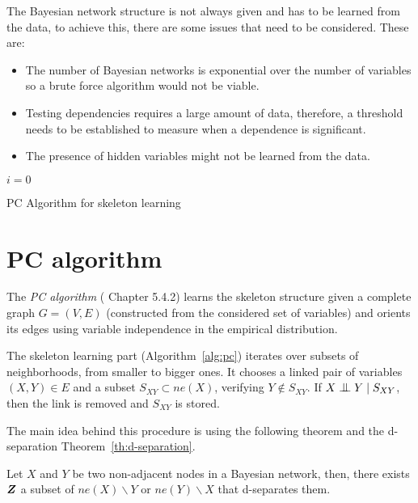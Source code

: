 
The Bayesian network structure is not always given and has to be learned from the data, to achieve this, there are some issues that need to be considered. These are:
\begin{itemize}\setlength{\itemsep}{0.15cm}
  \item The number of Bayesian networks is exponential over the number of variables so a brute force algorithm would not be viable.
  \item Testing dependencies requires a large amount of data, therefore, a threshold needs to be established to measure when a dependence is significant.
  \item The presence of hidden variables might not be learned from the data.
\end{itemize}


\begin{algorithm}[t]
  \SetAlgoLined{}
  \(i = 0\)\;
  \caption{PC Algorithm for skeleton learning}\label{alg:pc}
\end{algorithm}

\section{PC algorithm}

The \emph{PC algorithm} (\cite{spirtes2000causation} Chapter 5.4.2) learns the skeleton structure given a complete graph \(G=(V,E)\) (constructed from the considered set of variables) and orients its edges using variable independence in the empirical distribution.

The skeleton learning part (Algorithm~\ref{alg:pc}) iterates over subsets of neighborhoods, from smaller to bigger ones. It chooses a linked pair of variables \((X,Y) \in E\) and
a subset \(S_{XY} \subset ne(X)\), verifying \(Y \notin S_{XY}\). If \(X \bigCI Y \mid S_{XY}\), then the link is removed and \(S_{XY}\) is stored.

The main idea behind this procedure is using the following theorem and the d-separation Theorem~\ref{th:d-separation}.
\begin{theorem}
  Let \(X\) and \(Y\) be two non-adjacent nodes in a Bayesian network, then, there exists \(\bm{Z}\) a subset of \(ne(X)\backslash Y\) or \(ne(Y)\backslash X\) that d-separates them.
\end{theorem}

